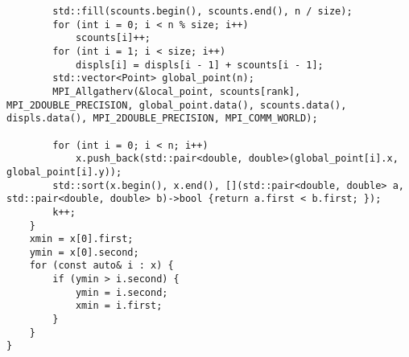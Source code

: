 \documentclass{report}
\begin{document}
\begin{lstlisting}
        std::fill(scounts.begin(), scounts.end(), n / size);
        for (int i = 0; i < n % size; i++)
            scounts[i]++;
        for (int i = 1; i < size; i++)
            displs[i] = displs[i - 1] + scounts[i - 1];
        std::vector<Point> global_point(n);
        MPI_Allgatherv(&local_point, scounts[rank], MPI_2DOUBLE_PRECISION, global_point.data(), scounts.data(), displs.data(), MPI_2DOUBLE_PRECISION, MPI_COMM_WORLD);

        for (int i = 0; i < n; i++)
            x.push_back(std::pair<double, double>(global_point[i].x, global_point[i].y));
        std::sort(x.begin(), x.end(), [](std::pair<double, double> a, std::pair<double, double> b)->bool {return a.first < b.first; });
        k++;
    }
    xmin = x[0].first;
    ymin = x[0].second;
    for (const auto& i : x) {
        if (ymin > i.second) {
            ymin = i.second;
            xmin = i.first;
        }
    }
}
\end{lstlisting}
\end{document}

